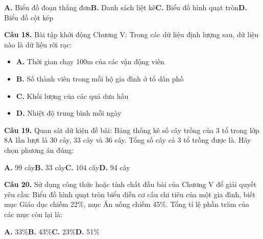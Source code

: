 \documentclass[11pt,a4paper]{article}
\begin{document}
\hspace*{1.5em}\textbf{A.} Biểu đồ đoạn thẳng đơn\quad\quad \textbf{B.} Danh sách liệt kê\quad\quad \textbf{C.} Biểu đồ hình quạt tròn\quad\quad \textbf{D.} Biểu đồ cột kép\par\vspace{2pt}
\textbf{\color{primary} Câu 18.} Bài tập khởi động Chương V: Trong các dữ liệu định lượng sau, dữ liệu nào là dữ liệu rời rạc:\par
\begin{itemize}\setlength{\itemsep}{1pt}\setlength{\parskip}{0pt}
  \item[] \textbf{A.} Thời gian chạy 100m của các vận động viên
  \item[] \textbf{B.} Số thành viên trong mỗi hộ gia đình ở tổ dân phố
  \item[] \textbf{C.} Khối lượng của các quả dưa hấu
  \item[] \textbf{D.} Nhiệt độ trung bình mỗi ngày
\end{itemize}\vspace{2pt}
\textbf{\color{primary} Câu 19.} Quan sát dữ kiện đề bài: Bảng thống kê số cây trồng của 3 tổ trong lớp 8A lần lượt là 30 cây, 33 cây và 36 cây. Tổng số cây cả 3 tổ trồng được là. Hãy chọn phương án đúng:\par
\hspace*{1.5em}\textbf{A.} 99 cây\quad\quad \textbf{B.} 33 cây\quad\quad \textbf{C.} 104 cây\quad\quad \textbf{D.} 94 cây\par\vspace{2pt}
\textbf{\color{primary} Câu 20.} Sử dụng công thức hoặc tính chất đầu bài của Chương V để giải quyết yêu cầu: Biểu đồ hình quạt tròn biểu diễn cơ cấu chi tiêu của một gia đình, biết mục Giáo dục chiếm 22\%, mục Ăn uống chiếm 45\%. Tổng tỉ lệ phần trăm của các mục còn lại là:\par
\hspace*{1.5em}\textbf{A.} 33\%\quad\quad \textbf{B.} 43\%\quad\quad \textbf{C.} 23\%\quad\quad \textbf{D.} 51\%\par\vspace{2pt}
\end{document}
